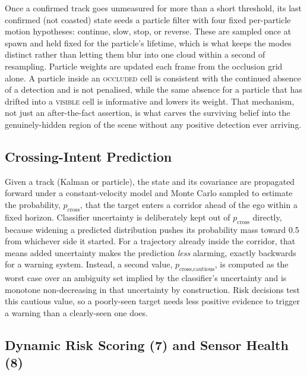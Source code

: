 \documentclass[conference]{IEEEtran}
\begin{document}
Once a confirmed track goes unmeasured for more than a short threshold,
its last confirmed (not coasted) state seeds a particle filter with
four fixed per-particle motion hypotheses: continue, slow, stop, or
reverse. These are sampled once at spawn and held fixed for the
particle's lifetime, which is what keeps the modes distinct rather than
letting them blur into one cloud within a second of resampling.
Particle weights are updated each frame from the occlusion grid alone.
A particle inside an \textsc{occluded} cell is consistent with the
continued absence of a detection and is not penalised, while the same
absence for a particle that has drifted into a \textsc{visible} cell is
informative and lowers its weight. That mechanism, not just an
after-the-fact assertion, is what carves the surviving belief into the
genuinely-hidden region of the scene without any positive detection
ever arriving.

\subsection{Crossing-Intent Prediction}

Given a track (Kalman or particle), the state and its covariance are
propagated forward under a constant-velocity model and Monte Carlo
sampled to estimate the probability, $p_{\text{cross}}$, that the
target enters a corridor ahead of the ego within a fixed horizon.
Classifier uncertainty is deliberately kept out of $p_{\text{cross}}$
directly, because widening a predicted distribution pushes its
probability mass toward 0.5 from whichever side it started. For a
trajectory already inside the corridor, that means added uncertainty
makes the prediction \emph{less} alarming, exactly backwards for a
warning system. Instead, a second value, $p_{\text{cross,cautious}}$,
is computed as the worst case over an ambiguity set implied by the
classifier's uncertainty and is monotone non-decreasing in that
uncertainty by construction. Risk decisions test this cautious value,
so a poorly-seen target needs less positive evidence to trigger a
warning than a clearly-seen one does.

\subsection{Dynamic Risk Scoring (7) and Sensor Health (8)}
\end{document}
